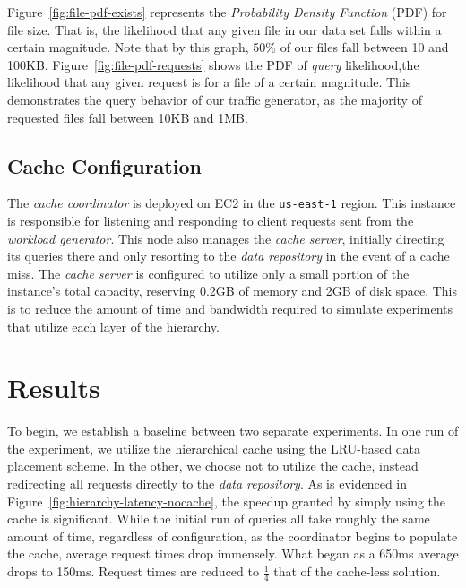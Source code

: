Figure~\ref{fig:file-pdf-exists} represents the \emph{Probability Density
Function} (PDF) for file size. That is, the likelihood that any given file in
our data set falls within a certain magnitude. Note that by this graph, 50\% of
our files fall between 10 and 100KB\@. Figure~\ref{fig:file-pdf-requests} shows
the PDF of \emph{query} likelihood,\ie the likelihood that any given request is
for a file of a certain magnitude. This demonstrates the query behavior of our
traffic generator, as the majority of requested files fall between 10KB and
1MB.

\subsection{Cache Configuration} %
\label{sub:cache_configuration}
The \emph{cache coordinator} is deployed on EC2 in the {\tt us-east-1} region.
This instance is responsible for listening and responding to client requests sent
from the \emph{workload generator}. This node also manages the \emph{cache
server}, initially directing its queries there and only resorting to the
\emph{data repository} in the event of a cache miss. The \emph{cache server}
is configured to utilize only a small portion of the instance's total capacity,
reserving 0.2GB of memory and 2GB of disk space. This is to reduce the amount
of time and bandwidth required to simulate experiments that utilize each layer
of the hierarchy.


\section{Results} %
\label{sec:results_storage}
To begin, we establish a baseline between two separate experiments. In one run
of the experiment, we utilize the hierarchical cache using the LRU-based data
placement scheme. In the other, we choose not to utilize the cache, instead
redirecting all requests directly to the \emph{data repository}. As is
evidenced in Figure~\ref{fig:hierarchy-latency-nocache}, the speedup granted by
simply using the cache is significant. While the initial run of queries all
take roughly the same amount of time, regardless of configuration, as the
coordinator begins to populate the cache, average request times drop immensely.
What began as a 650ms average drops to 150ms. Request times are reduced to
$\frac{1}{4}$ that of the cache-less solution.

